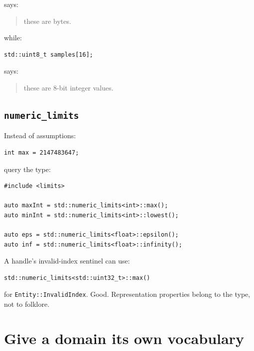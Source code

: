 says:

\begin{quote}
these are bytes.
\end{quote}

while:

\begin{verbatim}
std::uint8_t samples[16];
\end{verbatim}

says:

\begin{quote}
these are 8-bit integer values.
\end{quote}

\subsection{\texorpdfstring{\texttt{numeric\_limits}}{numeric\_limits}}\label{05-engine-i-ch002-numeric_limits}

\hypertarget{05-engine-i-ch002-numeric_limits}{}

Instead of assumptions:

\begin{verbatim}
int max = 2147483647;
\end{verbatim}

query the type:

\begin{verbatim}
#include <limits>

auto maxInt = std::numeric_limits<int>::max();
auto minInt = std::numeric_limits<int>::lowest();

auto eps = std::numeric_limits<float>::epsilon();
auto inf = std::numeric_limits<float>::infinity();
\end{verbatim}

A handle's invalid-index sentinel can use:

\begin{verbatim}
std::numeric_limits<std::uint32_t>::max()
\end{verbatim}

for \texttt{Entity::InvalidIndex}. Good. Representation properties belong to the type, not to folklore.

\section{Give a domain its own vocabulary}\label{05-engine-i-ch002-give-a-domain-its-own-vocabulary}

\hypertarget{05-engine-i-ch002-give-a-domain-its-own-vocabulary}{}

